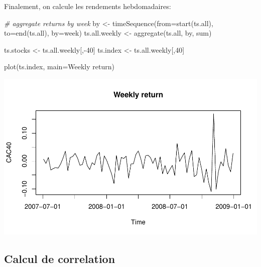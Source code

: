 \documentclass[
]{article}
\newenvironment{Shaded}{\begin{snugshade}}{\end{snugshade}}
\newcommand{\AttributeTok}[1]{\textcolor[rgb]{0.77,0.63,0.00}{#1}}
\newcommand{\CommentTok}[1]{\textcolor[rgb]{0.56,0.35,0.01}{\textit{#1}}}
\newcommand{\DecValTok}[1]{\textcolor[rgb]{0.00,0.00,0.81}{#1}}
\newcommand{\FunctionTok}[1]{\textcolor[rgb]{0.00,0.00,0.00}{#1}}
\newcommand{\NormalTok}[1]{#1}
\newcommand{\OtherTok}[1]{\textcolor[rgb]{0.56,0.35,0.01}{#1}}
\newcommand{\SpecialCharTok}[1]{\textcolor[rgb]{0.00,0.00,0.00}{#1}}
\newcommand{\StringTok}[1]{\textcolor[rgb]{0.31,0.60,0.02}{#1}}
\begin{document}
Finalement, on calcule les rendements hebdomadaires:

\begin{Shaded}
\begin{Highlighting}[]
  \CommentTok{\# aggregate returns by week}
\NormalTok{  by }\OtherTok{\textless{}{-}} \FunctionTok{timeSequence}\NormalTok{(}\AttributeTok{from=}\FunctionTok{start}\NormalTok{(ts.all), }
                     \AttributeTok{to=}\FunctionTok{end}\NormalTok{(ts.all), }\AttributeTok{by=}\StringTok{\textquotesingle{}week\textquotesingle{}}\NormalTok{)}
\NormalTok{  ts.all.weekly }\OtherTok{\textless{}{-}} \FunctionTok{aggregate}\NormalTok{(ts.all, by, sum)}

\NormalTok{  ts.stocks }\OtherTok{\textless{}{-}}\NormalTok{ ts.all.weekly[,}\SpecialCharTok{{-}}\DecValTok{40}\NormalTok{]}
\NormalTok{  ts.index }\OtherTok{\textless{}{-}}\NormalTok{ ts.all.weekly[,}\DecValTok{40}\NormalTok{]}
\end{Highlighting}
\end{Shaded}

\begin{Shaded}
\begin{Highlighting}[]
\FunctionTok{plot}\NormalTok{(ts.index, }\AttributeTok{main=}\StringTok{\textquotesingle{}Weekly return\textquotesingle{}}\NormalTok{)}
\end{Highlighting}
\end{Shaded}

\includegraphics{TP1-Co_files/figure-latex/plot-cac-2-1.pdf}

\hypertarget{calcul-de-correlation}{%
\subsection{Calcul de correlation}\label{calcul-de-correlation}}
\end{document}
